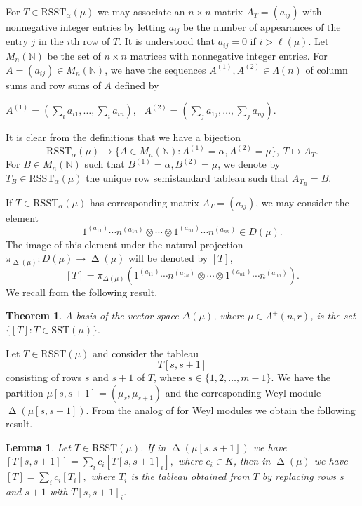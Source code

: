 \documentclass[11pt]{article}
\newtheorem{theorem}[theo]{Theorem}
\newtheorem{lemma}[theo]{Lemma}
\theoremstyle{definition}
\numberwithin{equation}{section}
\newcommand{\al}{\alpha}
\newcommand{\La}{\Lambda}
\DeclareMathOperator{\D}{\mathrm{\Delta}}
\numberwithin{equation}{section}
\begin{document}
For $T \in \mathrm{RSST}_{\alpha}(\mu)$ we may associate an $n \times n$ matrix $A_T=(a_{ij})$ with nonnegative integer entries by letting $a_{ij}$ be the number of appearances of the entry $j$ in the $i$th row of $T$. It is understood that $a_{ij}=0$ if $i>\ell(\mu)$. Let  $M_{n}(\mathbb{N})$ be the set of $n \times n$ matrices with nonnegative integer entries.  For $A=(a_{ij}) \in M_{n}(\mathbb{N})$, we have the sequences $A^{(1)}, A^{(2)} \in \La(n)$ of column sums and row sums of $A$ defined by \begin{center}
	$A^{(1)}=(\sum_ia_{i1},\dots,\sum_ia_{in})$, \  $A^{(2)}=(\sum_ja_{1j},\dots,\sum_ja_{nj})$.
\end{center} It is clear from the definitions that we have a bijection \begin{equation}\label{bijection1}\mathrm{RSST}_{\alpha}(\mu) \to \{A \in M_{n}(\mathbb{N}): A^{(1)} =\al, A^{(2)} =\mu \},\  T \mapsto A_T.\end{equation} For $B \in  M_{n}(\mathbb{N})$ such that $B^{(1)} =\al, B^{(2)} =\mu$, we denote by $T_B \in \mathrm{RSST}_{\alpha}(\mu)$ the unique row semistandard tableau such that $A_{T_B}=B$. 

If $T \in \mathrm{RSST}_{\alpha}(\mu)$ has corresponding matrix $A_T=(a_{ij})$, we may consider the element \[1^{(a_{11})} \cdots n^{(a_{1n})} \otimes \cdots \otimes 1^{(a_{n1})} \cdots n^{(a_{nn})} \in D(\mu).\] The image of this element under the natural projection ${\pi}_{\D(\mu)} : D(\mu) \to \D(\mu)$ will be denoted by $[T]$, \[[T]=\pi_{\Delta(\mu)}(1^{(a_{11})} \cdots n^{(a_{1n})} \otimes \cdots \otimes 1^{(a_{n1})} \cdots n^{(a_{nn})}).\] We recall from \cite{ABW} the following result.
\begin{theorem}\label{standard}
	A basis of the vector space $\Delta(\mu)$, where $\mu \in \La^{+}(n,r)$, is the set $\{[T]: T \in \mathrm{SST}(\mu)\}.$
\end{theorem}
Let $T \in \mathrm{RSST}(\mu)$ and consider the tableau \[T[s,s+1]\] consisting of rows $s$ and $s+1$ of $T$, where $s \in \{1,2,\dots,m-1\}$. We have the partition $\mu[s,s+1]=(\mu_s, \mu_{s+1})$ and the corresponding Weyl module $\D(\mu[s,s+1])$. From the analog of \cite[Lemma II.2.3]{ABW} for Weyl modules we obtain the following result.
\begin{lemma}\label{insertrows}
Let $T \in \mathrm{RSST}(\mu)$. If in $\D(\mu[s,s+1])$ we have $[T[s,s+1]]=\sum_ic_i[T[s,s+1]_i],$ where $c_i \in K$, then in $\D(\mu)$ we have $[T]=\sum_ic_i[T_i],$ where $T_i$ is the tableau obtained from $T$ by replacing rows $s$ and $s+1$ with $T[s,s+1]_i$.
\end{lemma}
\end{document}
